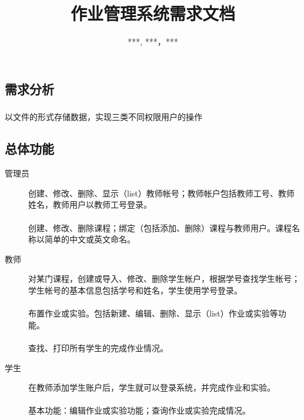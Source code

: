 \documentclass[notitlepage,cs4size,punct,oneside]{report}
\begin{document}
\begin{CJK}{UTF8}{hei} %


\renewcommand{\abstractname}{摘 \qquad 要}
\renewcommand{\contentsname}{\center 目\qquad\qquad 录}
\renewcommand{\listfigurename}{图 \quad 示 \quad 目 \quad 录}
\renewcommand{\listtablename}{表 \quad 格 \quad 目 \quad 录}
\renewcommand{\appendixname}{附录}
\renewcommand{\chaptername}{章节}
\renewcommand{\indexname}{\center 索 \qquad 引}
\renewcommand{\figurename}{图}
\renewcommand{\tablename}{表}

\newcommand{\upcite}[1]{\textsuperscript{\cite{#1}}}


\title{作业管理系统需求文档}
\author{***, ***，***}

\maketitle
\tableofcontents
\pagebreak

\chapter{需求分析}
\paragraph{}以文件的形式存储数据，实现三类不同权限用户的操作
\section{总体功能}
\begin{description}
  \item[管理员] 创建、修改、删除、显示（list）教师帐号；教师帐户包括教师工号、教师姓名，教师用户以教师工号登录。\\ \\
 创建、修改、删除课程；绑定（包括添加、删除）课程与教师用户。课程名称以简单的中文或英文命名。
  \item[教师 ] 对某门课程，创建或导入、修改、删除学生帐户，根据学号查找学生帐号；学生帐号的基本信息包括学号和姓名，学生使用学号登录。\\ \\
  布置作业或实验。包括新建、编辑、删除、显示（list）作业或实验等功能。\\ \\
  查找、打印所有学生的完成作业情况。
  \item[学生 ] 在教师添加学生账户后，学生就可以登录系统，并完成作业和实验。\\ \\
  基本功能：编辑作业或实验功能；查询作业或实验完成情况。
\end{description}

\end{CJK}
\end{document}
